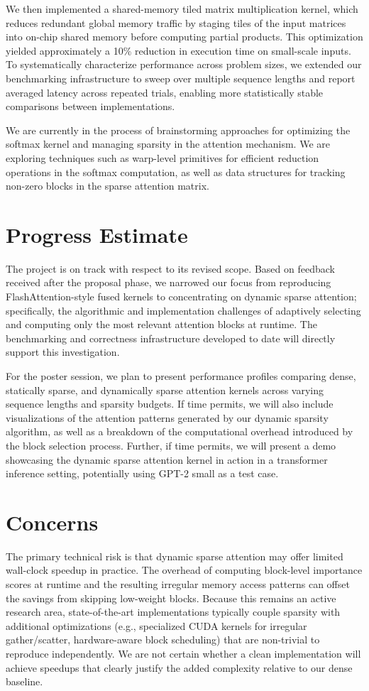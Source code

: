 \documentclass[11pt]{article}
\begin{document}
We then implemented a shared-memory tiled matrix multiplication kernel, which reduces redundant global memory traffic by staging tiles of the input matrices into on-chip shared memory before computing partial products. This optimization yielded approximately a 10\% reduction in execution time on small-scale inputs. To systematically characterize performance across problem sizes, we extended our benchmarking infrastructure to sweep over multiple sequence lengths and report averaged latency across repeated trials, enabling more statistically stable comparisons between implementations.

We are currently in the process of brainstorming approaches for optimizing the softmax kernel and managing sparsity in the attention mechanism. We are exploring techniques such as warp-level primitives for efficient reduction operations in the softmax computation, as well as data structures for tracking non-zero blocks in the sparse attention matrix.

\section*{Progress Estimate}
The project is on track with respect to its revised scope. Based on feedback received after the proposal phase, we narrowed our focus from reproducing FlashAttention-style fused kernels to concentrating on dynamic sparse attention; specifically, the algorithmic and implementation challenges of adaptively selecting and computing only the most relevant attention blocks at runtime. The benchmarking and correctness infrastructure developed to date will directly support this investigation.

For the poster session, we plan to present performance profiles comparing dense, statically sparse, and dynamically sparse attention kernels across varying sequence lengths and sparsity budgets. If time permits, we will also include visualizations of the attention patterns generated by our dynamic sparsity algorithm, as well as a breakdown of the computational overhead introduced by the block selection process. Further, if time permits, we will present a demo showcasing the dynamic sparse attention kernel in action in a transformer inference setting, potentially using GPT-2 small as a test case.

\section*{Concerns}
The primary technical risk is that dynamic sparse attention may offer limited wall-clock speedup in practice. The overhead of computing block-level importance scores at runtime and the resulting irregular memory access patterns can offset the savings from skipping low-weight blocks. Because this remains an active research area, state-of-the-art implementations typically couple sparsity with additional optimizations (e.g., specialized CUDA kernels for irregular gather/scatter, hardware-aware block scheduling) that are non-trivial to reproduce independently. We are not certain whether a clean implementation will achieve speedups that clearly justify the added complexity relative to our dense baseline.
\end{document}
